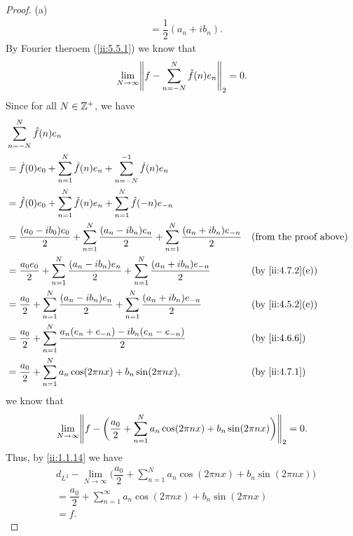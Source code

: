 \begin{proof}{(a)}
\begin{align*}
     & = \dfrac{1}{2} (a_n + i b_n).
  \end{align*}
  By Fourier theroem (\cref{ii:5.5.1}) we know that
  \[
    \lim_{N \to \infty} \norm*{f - \sum_{n = -N}^N \hat{f}(n) e_n}_2 = 0.
  \]
  Since for all \(N \in \mathbb{Z}^+\), we have
  \begin{align*}
     & \sum_{n = -N}^N \hat{f}(n) e_n                                                                                                                                   \\
     & = \hat{f}(0) e_0 + \sum_{n = 1}^N \hat{f}(n) e_n + \sum_{n = -N}^{-1} \hat{f}(n) e_n                                                                             \\
     & = \hat{f}(0) e_0 + \sum_{n = 1}^N \hat{f}(n) e_n + \sum_{n = 1}^N \hat{f}(-n) e_{-n}                                                                             \\
     & = \dfrac{(a_0 - i b_0) e_0}{2} + \sum_{n = 1}^N \dfrac{(a_n - i b_n) e_n}{2} + \sum_{n = 1}^N \dfrac{(a_n + i b_n) e_{-n}}{2} &  & \text{(from the proof above)} \\
     & = \dfrac{a_0 e_0}{2} + \sum_{n = 1}^N \dfrac{(a_n - i b_n) e_n}{2} + \sum_{n = 1}^N \dfrac{(a_n + i b_n) e_{-n}}{2}           &  & \by{ii:4.7.2}[e]              \\
     & = \dfrac{a_0}{2} + \sum_{n = 1}^N \dfrac{(a_n - i b_n) e_n}{2} + \sum_{n = 1}^N \dfrac{(a_n + i b_n) e_{-n}}{2}               &  & \by{ii:4.5.2}[e]              \\
     & = \dfrac{a_0}{2} + \sum_{n = 1}^N \dfrac{a_n (e_n + e_{-n}) - i b_n (e_n - e_{-n})}{2}                                        &  & \by{ii:4.6.6}                 \\
     & = \dfrac{a_0}{2} + \sum_{n = 1}^N a_n \cos(2 \pi n x) + b_n \sin(2 \pi n x),                                                  &  & \by{ii:4.7.1}
  \end{align*}
  we know that
  \[
    \lim_{N \to \infty} \norm*{f - \bigg(\dfrac{a_0}{2} + \sum_{n = 1}^N a_n \cos(2 \pi n x) + b_n \sin(2 \pi n x)\bigg)}_2 = 0.
  \]
  Thus, by \cref{ii:1.1.14} we have
  \begin{align*}
     & d_{L^2} - \lim_{N \to \infty} \bigg(\dfrac{a_0}{2} + \sum_{n = 1}^N a_n \cos(2 \pi n x) + b_n \sin(2 \pi n x)\bigg) \\
     & = \dfrac{a_0}{2} + \sum_{n = 1}^\infty a_n \cos(2 \pi n x) + b_n \sin(2 \pi n x)                                    \\
     & = f.
  \end{align*}
\end{proof}

